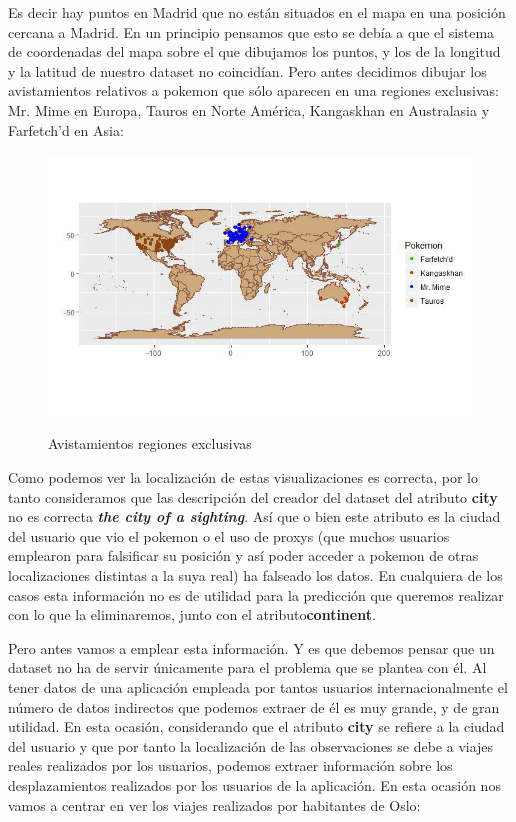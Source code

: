 Es decir hay puntos en Madrid que no están situados en el mapa en una posición cercana a Madrid. En un principio pensamos que esto se debía a que el sistema de coordenadas del mapa sobre el que dibujamos los puntos, y los de la longitud y la latitud de nuestro dataset no coincidían. Pero antes decidimos dibujar los avistamientos relativos a pokemon que sólo aparecen en una regiones exclusivas: Mr. Mime en Europa, Tauros en Norte América, Kangaskhan en Australasia y Farfetch'd en Asia:

\begin{figure}[H] %
\centering
\includegraphics[scale=0.8]{img/exclusivos.jpg}  %
\label{img/exclusivos.jpg}
\caption{Avistamientos regiones exclusivas}
\end{figure}

Como podemos ver la localización de estas visualizaciones es correcta, por lo tanto consideramos que las descripción del creador del dataset del atributo \textbf{city} no es correcta  \textbf\textit{the city of a sighting}. Así que o bien este atributo es la ciudad del usuario que vio el pokemon o el uso de proxys (que muchos usuarios emplearon para falsificar su posición y así poder acceder a pokemon de otras localizaciones distintas a la suya real) ha falseado los datos. En cualquiera de los casos esta información no es de utilidad para la predicción que queremos realizar con lo que la eliminaremos, junto con el atributo\textbf{continent}.

Pero antes vamos a emplear esta información. Y es que debemos pensar que un dataset no ha de servir únicamente para el problema que se plantea con él. Al tener datos de una aplicación empleada por tantos usuarios internacionalmente el número de datos indirectos que podemos extraer de él es muy grande, y de gran utilidad. En esta ocasión, considerando que el atributo \textbf{city} se refiere a la ciudad del usuario y que por tanto la localización de las observaciones se debe a viajes reales realizados por los usuarios, podemos extraer información sobre los desplazamientos realizados por los usuarios de la aplicación. En esta ocasión nos vamos a centrar en ver los viajes realizados por habitantes de Oslo:

